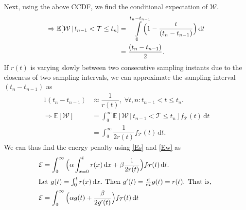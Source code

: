 Next, using the above \gls{CCDF}, we find the conditional expectation of $\mathcal{W}$.
\begin{alignat*}{1}
\Rightarrow \mathbb{E}[\mathcal{W}\,|\,t_{n-1}<\mathcal{T}\leq t_n]&=\smashoperator[r]{\int_{0}^{t_n-t_{n-1}}}\Big(1-\dfrac{t}{(t_{n}-t_{n-1})}\Big)\,\mathrm{d}t\\
&=\dfrac{(t_n-t_{n-1})}{2}.
\end{alignat*}
If $r(t)$ is varying slowly between two consecutive sampling instants due to the closeness of two sampling intervals, we can approximate the sampling interval $(t_n\!-\!t_{n-1})$ as
\begin{alignat}{1}
 (t_n-t_{n-1})&\approx\dfrac{1}{r(t)},\;\forall t,n:t_{n-1}\!<\!t\!\leq\!t_n.\label{Apx3}\\
\Rightarrow \mathbb{E}[\mathcal{W}]&=\int_{0}^{\infty}\mathbb{E}[\mathcal{W}\,|\,t_{n-1}<\mathcal{T}\leq t_n]f_\mathcal{T}(t)\,\mathrm{d}t\nonumber\\
&=\int_{0}^{\infty}\dfrac{1}{2r(t)}f_\mathcal{T}(t)\,\mathrm{d}t.\label{Ew}
\end{alignat}
We can thus find the energy penalty using \cref{Es} and \cref{Ew} as
\begin{alignat*}{1}
\mathcal{E}&=\int_{0}^{\infty}\Big(\alpha\int_{x=0}^{t}r(x)\,\mathrm{d}x+\beta\dfrac{1}{2r(t)}\Big)f_{\mathcal{T}}(t)\,\mathrm{d}t.\label{epsilon_eulerForm}\\
\intertext{%
    Let $g(t)=\int_{0}^{t}r(x)\dif x$.
    Then  $g'(t)=\tfrac{\mathrm{d}}{\mathrm{d}t}g(t)=r(t)$.
    That is,
}
\mathcal{E}&=\int_{0}^{\infty}\Big(\alpha g(t)+\dfrac{\beta}{2g'(t)}\Big)f_{\mathcal{T}}(t)\,\mathrm{d}t
\end{alignat*}

